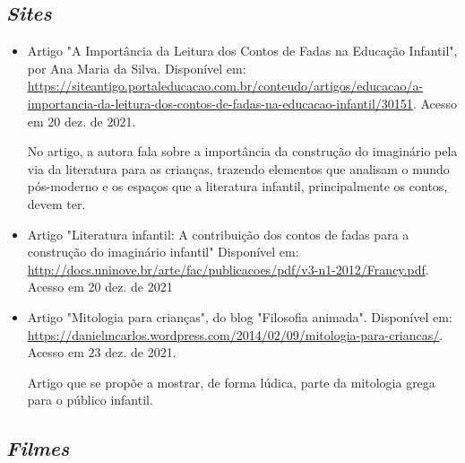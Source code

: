 \documentclass[11pt]{extarticle}
\begin{document}
\subsection{\textit{Sites}}

\begin{itemize}
\item Artigo "A Importância da Leitura dos Contos de Fadas na Educação Infantil", por Ana Maria da Silva. Disponível em: \url{https://siteantigo.portaleducacao.com.br/conteudo/artigos/educacao/a-importancia-da-leitura-dos-contos-de-fadas-na-educacao-infantil/30151}. 
Acesso em 20 dez. de 2021.

No artigo, a autora fala sobre a importância da construção do imaginário pela via da literatura para as crianças, trazendo elementos que analisam o mundo pós-moderno e os espaços que a literatura infantil, principalmente os contos, devem ter.

\item Artigo "Literatura infantil: A contribuição dos contos de fadas para a construção do imaginário infantil" Disponível em: \url{http://docs.uninove.br/arte/fac/publicacoes/pdf/v3-n1-2012/Francy.pdf}. Acesso em 20 dez. de 2021

\item Artigo "Mitologia para crianças", do blog "Filosofia animada". Disponível em: \url{https://danielmcarlos.wordpress.com/2014/02/09/mitologia-para-criancas/}. Acesso em 23 dez. de 2021. 

Artigo que se propõe a mostrar, de forma lúdica, parte da mitologia grega para o público infantil.

\end{itemize}

\subsection{\textit{Filmes}}
\end{document}
